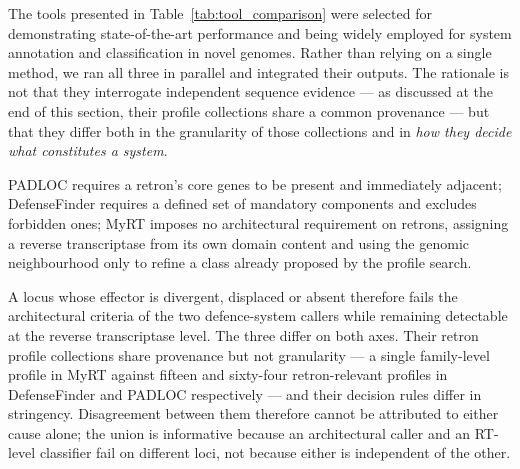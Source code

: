The tools presented in Table~\ref{tab:tool_comparison} were selected for demonstrating state-of-the-art performance
and being widely employed for system annotation and classification in novel
genomes. Rather than relying on a single method, we ran all three in parallel and
integrated their outputs. The rationale is not that they interrogate independent sequence evidence --- as discussed at the end of this section, their profile collections share a common provenance --- but that they differ both in the granularity of those collections and in \emph{how they decide what constitutes a system}.



PADLOC requires a retron's core genes to be
present and immediately adjacent; DefenseFinder requires a defined set of mandatory
components and excludes forbidden ones; MyRT imposes no architectural requirement on retrons, assigning a reverse transcriptase from its own domain content and using the genomic neighbourhood only to refine a class already proposed by the profile search.


A locus whose effector is divergent,
displaced or absent therefore fails the architectural criteria of the two
defence-system callers while remaining detectable at the reverse transcriptase
level. The three differ on both axes. Their retron profile collections share provenance but not granularity --- a single family-level profile in MyRT against fifteen and sixty-four retron-relevant profiles in DefenseFinder and PADLOC respectively --- and their decision rules differ in stringency. Disagreement between them therefore cannot be attributed to either cause alone; the union is informative because an architectural caller and an RT-level classifier fail on different loci, not because either is independent of the other.


